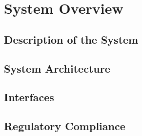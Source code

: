 \chapter{System Overview}

\section{Description of the System}
\section{ System Architecture}
\section{Interfaces}
\section{Regulatory Compliance}





